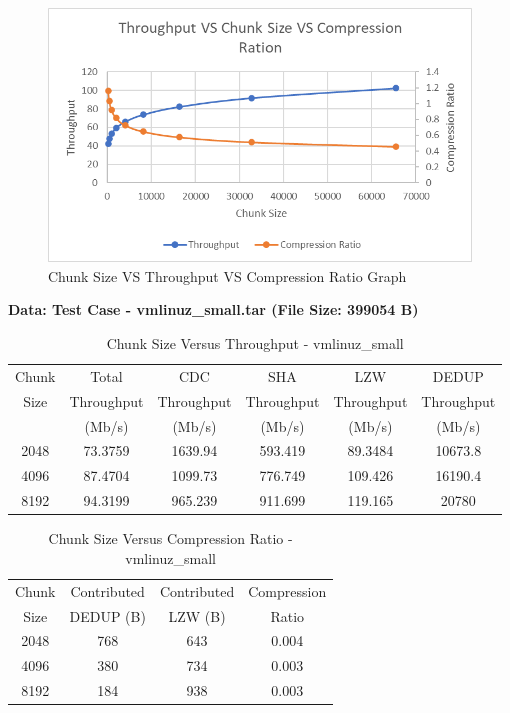 \documentclass[../main.tex]{subfiles}
\begin{document}
\begin{figure}[H]
    \centering
    \includegraphics[width=0.7\linewidth]{Images/image19.png}
    \caption{Chunk Size VS Throughput VS Compression Ratio Graph}
    \label{fig:chunk_comp_graph}
\end{figure}

\vspace{0.5cm}

\noindent \textbf{Data: Test Case - vmlinuz\_small.tar (File Size: 399054 B)}

\begin{table}[H]
    \centering
    \begin{tabular}{|c|c|c|c|c|c|} \hline 
         Chunk&  Total&  CDC &  SHA &  LZW &  DEDUP \\ 
         Size& Throughput&  Throughput&  Throughput&  Throughput&  Throughput \\
         & (Mb/s)&  (Mb/s)&  (Mb/s)&  (Mb/s)&  (Mb/s) \\ \hline
         2048&  73.3759&  1639.94&  593.419&  89.3484&  10673.8\\ \hline 
         4096&  87.4704&  1099.73&  776.749&  109.426&  16190.4\\ \hline 
         8192&  94.3199&  965.239&  911.699&  119.165&   20780\\ \hline
    \end{tabular}
    \caption{Chunk Size Versus Throughput - vmlinuz\_small}
    \label{tab:chunk_graph_2}
\end{table}

\begin{table}[H]
    \centering
    \begin{tabular}{|c|c|c|c|} \hline 
         Chunk&  Contributed & Contributed& Compression\\
         Size&  DEDUP (B)& LZW (B)& Ratio\\ \hline
         2048&  768&  643& 0.004\\ \hline 
         4096&  380&  734& 0.003\\ \hline 
         8192&  184&  938& 0.003\\ \hline
    \end{tabular}
    \caption{Chunk Size Versus Compression Ratio - vmlinuz\_small}
    \label{tab:chunk_comp_2}
\end{table}
\end{document}
